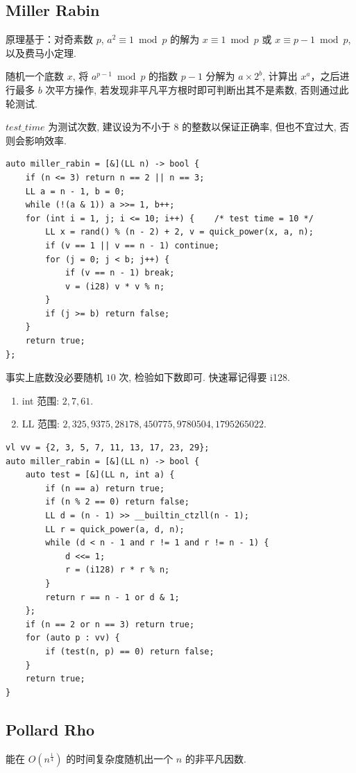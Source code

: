 \documentclass[UTF8, a4paper, titlepage, twoside]{ctexart}
\begin{document}
\subsection{ Miller Rabin }
原理基于：对奇素数 $p$, $a^2 \equiv 1 \bmod p$ 的解为 $x \equiv 1 \bmod p$ 或 $x \equiv p - 1 \bmod p$, 以及费马小定理.

随机一个底数 $x$, 将 $a ^ {p - 1} \bmod p$ 的指数 $p - 1$ 分解为 $a \times 2^b$, 计算出 $x^a$，之后进行最多 $b$ 次平方操作, 若发现非平凡平方根时即可判断出其不是素数, 否则通过此轮测试.

$test\_time$ 为测试次数, 建议设为不小于 $8$ 的整数以保证正确率, 但也不宜过大, 否则会影响效率.

\begin{lstlisting}[style=cpp]
auto miller_rabin = [&](LL n) -> bool {
    if (n <= 3) return n == 2 || n == 3;
    LL a = n - 1, b = 0;
    while (!(a & 1)) a >>= 1, b++;
    for (int i = 1, j; i <= 10; i++) {    /* test time = 10 */
        LL x = rand() % (n - 2) + 2, v = quick_power(x, a, n);
        if (v == 1 || v == n - 1) continue;
        for (j = 0; j < b; j++) {
            if (v == n - 1) break;
            v = (i28) v * v % n;
        }
        if (j >= b) return false;
    }
    return true;
};
\end{lstlisting}

事实上底数没必要随机 \(10\) 次, 检验如下数即可. 快速幂记得要 i128.

\begin{enumerate}
	\item int 范围: \(2, 7, 61\).
	\item LL 范围: \(2, 325, 9375, 28178, 450775, 9780504, 1795265022\).
\end{enumerate}

\begin{lstlisting}[style=cpp]
vl vv = {2, 3, 5, 7, 11, 13, 17, 23, 29};
auto miller_rabin = [&](LL n) -> bool {
    auto test = [&](LL n, int a) {
        if (n == a) return true;
        if (n % 2 == 0) return false;
        LL d = (n - 1) >> __builtin_ctzll(n - 1);
        LL r = quick_power(a, d, n);
        while (d < n - 1 and r != 1 and r != n - 1) {
            d <<= 1;
            r = (i128) r * r % n;
        }
        return r == n - 1 or d & 1;
    };
    if (n == 2 or n == 3) return true;
    for (auto p : vv) {
        if (test(n, p) == 0) return false;
    }
    return true;
}
\end{lstlisting}

\subsection{ Pollard Rho }
能在 \(O(n^{\frac{1}{4}})\) 的时间复杂度随机出一个 \(n\) 的非平凡因数.
\end{document}
